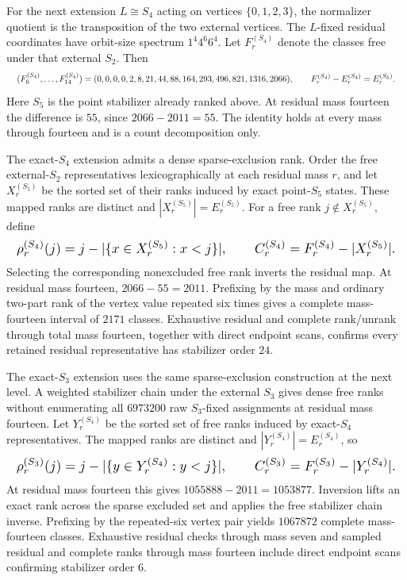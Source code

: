 \documentclass{article}
\newcommand{\fitmath}[1]{\resizebox{0.99\linewidth}{!}{$\displaystyle #1$}}
\begin{document}
For the next extension $L\cong S_4$ acting on vertices $\{0,1,2,3\}$, the
normalizer quotient is the transposition of the two external vertices. The
$L$-fixed residual coordinates have orbit-size spectrum $1^4 4^6 6^4$. Let
$F_r^{(S_4)}$ denote the classes free under that external $S_2$. Then
\begin{equation}
  \fitmath{%
    (F_0^{(S_4)},\ldots,F_{14}^{(S_4)})=
    (0,0,0,0,2,8,21,44,88,164,293,496,821,1316,2066),
    \qquad
    F_r^{(S_4)}-E_r^{(S_4)}=E_r^{(S_5)}.
  }
  \label{eq:optimization-crazy-sextuple-s6-full-s4-extension-decomposition}
\end{equation}
Here $S_5$ is the point stabilizer already ranked above. At residual mass
fourteen the difference is $55$, since $2066-2011=55$. The identity holds at
every mass through fourteen and is a count decomposition only.

The exact-$S_4$ extension admits a dense sparse-exclusion rank. Order the free
external-$S_2$ representatives lexicographically at each residual mass $r$, and
let $X_r^{(S_5)}$ be the sorted set of their ranks induced by exact point-$S_5$
states. These mapped ranks are distinct and
$|X_r^{(S_5)}|=E_r^{(S_5)}$. For a free rank $j\notin X_r^{(S_5)}$, define
\begin{equation}
  \fitmath{%
    \rho_r^{(S_4)}(j)=j-
      |\{x\in X_r^{(S_5)}:x<j\}|,
    \qquad
    C_r^{(S_4)}=F_r^{(S_4)}-|X_r^{(S_5)}|.
  }
  \label{eq:optimization-crazy-sextuple-s6-full-s4-stabilizer-ranking}
\end{equation}
Selecting the corresponding nonexcluded free rank inverts the residual map.
At residual mass fourteen, $2066-55=2011$. Prefixing by the mass and ordinary
two-part rank of the vertex value repeated six times gives a complete
mass-fourteen interval of $2171$ classes. Exhaustive residual and complete
rank/unrank through total mass fourteen, together with direct endpoint scans,
confirms every retained residual representative has stabilizer order $24$.

The exact-$S_3$ extension uses the same sparse-exclusion construction at the
next level. A weighted stabilizer chain under the external $S_3$ gives dense
free ranks without enumerating all $6973200$ raw $S_3$-fixed assignments at
residual mass fourteen. Let $Y_r^{(S_4)}$ be the sorted set of free ranks
induced by exact-$S_4$ representatives. The mapped ranks are distinct and
$|Y_r^{(S_4)}|=E_r^{(S_4)}$, so
\begin{equation}
  \fitmath{%
    \rho_r^{(S_3)}(j)=j-
      |\{y\in Y_r^{(S_4)}:y<j\}|,
    \qquad
    C_r^{(S_3)}=F_r^{(S_3)}-|Y_r^{(S_4)}|.
  }
  \label{eq:optimization-crazy-sextuple-s6-full-s3-stabilizer-ranking}
\end{equation}
At residual mass fourteen this gives $1055888-2011=1053877$. Inversion lifts
an exact rank across the sparse excluded set and applies the free stabilizer
chain inverse. Prefixing by the repeated-six vertex pair yields $1067872$
complete mass-fourteen classes. Exhaustive residual checks through mass seven
and sampled residual and complete ranks through mass fourteen include direct
endpoint scans confirming stabilizer order $6$.
\end{document}
